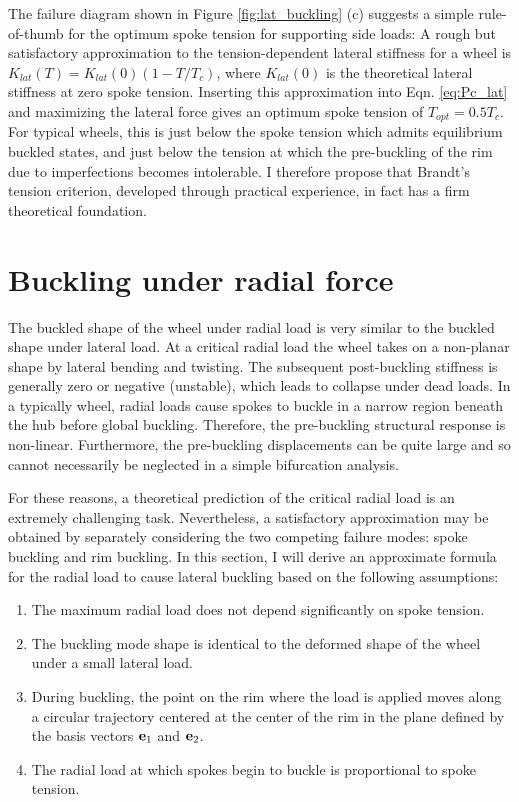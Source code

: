 \documentclass[\rootdir/thesis.tex]{subfiles}
\begin{document}
The failure diagram shown in Figure \ref{fig:lat_buckling} (c) suggests a simple rule-of-thumb for the optimum spoke tension for supporting side loads: A rough but satisfactory approximation to the tension-dependent lateral stiffness for a wheel is $K_{lat} (T)=K_{lat} (0)(1-T/T_c)$, where $K_{lat} (0)$ is the theoretical lateral stiffness at zero spoke tension. Inserting this approximation into Eqn. \eqref{eq:Pc_lat} and maximizing the lateral force gives an optimum spoke tension of $T_{opt} = 0.5 T_c$. For typical wheels, this is just below the spoke tension which admits equilibrium buckled states, and just below the tension at which the pre-buckling of the rim due to imperfections becomes intolerable. I therefore propose that Brandt's tension criterion, developed through practical experience, in fact has a firm theoretical foundation.


\section{Buckling under radial force}

The buckled shape of the wheel under radial load is very similar to the buckled shape under lateral load. At a critical radial load the wheel takes on a non-planar shape by lateral bending and twisting. The subsequent post-buckling stiffness is generally zero or negative (unstable), which leads to collapse under dead loads. In a typically wheel, radial loads cause spokes to buckle in a narrow region beneath the hub before global buckling. Therefore, the pre-buckling structural response is non-linear. Furthermore, the pre-buckling displacements can be quite large and so cannot necessarily be neglected in a simple bifurcation analysis.

For these reasons, a theoretical prediction of the critical radial load is an extremely challenging task. Nevertheless, a satisfactory approximation may be obtained by separately considering the two competing failure modes: spoke buckling and rim buckling. In this section, I will derive an approximate formula for the radial load to cause lateral buckling based on the following assumptions:

\begin{enumerate}
\item{The maximum radial load does not depend significantly on spoke tension.}\label{assum:no_T_effect}
\item{The buckling mode shape is identical to the deformed shape of the wheel under a small lateral load.}\label{assum:lat_shape}
\item{During buckling, the point on the rim where the load is applied moves along a circular trajectory centered at the center of the rim in the plane defined by the basis vectors $\mathbf{e}_1$ and $\mathbf{e}_2$.}\label{assum:circ_path}
\item{The radial load at which spokes begin to buckle is proportional to spoke tension.}\label{assum:Psb_T}
\end{enumerate}
\end{document}
